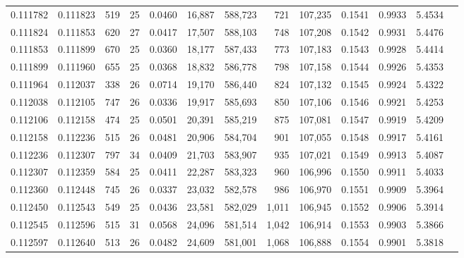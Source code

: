 \begin{tabular}{rrrrrrrrrrrrr}
0.111782 & 0.111823 & 519 &  25 &                                     0.0460 &  16,887 & 588,723 &     721 & 107,235 & 0.1541 & 0.9933 & 5.4534 \\
0.111824 & 0.111853 & 620 &  27 &                                     0.0417 &  17,507 & 588,103 &     748 & 107,208 & 0.1542 & 0.9931 & 5.4476 \\
0.111853 & 0.111899 & 670 &  25 &                                     0.0360 &  18,177 & 587,433 &     773 & 107,183 & 0.1543 & 0.9928 & 5.4414 \\
0.111899 & 0.111960 & 655 &  25 &                                     0.0368 &  18,832 & 586,778 &     798 & 107,158 & 0.1544 & 0.9926 & 5.4353 \\
0.111964 & 0.112037 & 338 &  26 &                                     0.0714 &  19,170 & 586,440 &     824 & 107,132 & 0.1545 & 0.9924 & 5.4322 \\
0.112038 & 0.112105 & 747 &  26 &                                     0.0336 &  19,917 & 585,693 &     850 & 107,106 & 0.1546 & 0.9921 & 5.4253 \\
0.112106 & 0.112158 & 474 &  25 &                                     0.0501 &  20,391 & 585,219 &     875 & 107,081 & 0.1547 & 0.9919 & 5.4209 \\
0.112158 & 0.112236 & 515 &  26 &                                     0.0481 &  20,906 & 584,704 &     901 & 107,055 & 0.1548 & 0.9917 & 5.4161 \\
0.112236 & 0.112307 & 797 &  34 &                                     0.0409 &  21,703 & 583,907 &     935 & 107,021 & 0.1549 & 0.9913 & 5.4087 \\
0.112307 & 0.112359 & 584 &  25 &                                     0.0411 &  22,287 & 583,323 &     960 & 106,996 & 0.1550 & 0.9911 & 5.4033 \\
0.112360 & 0.112448 & 745 &  26 &                                     0.0337 &  23,032 & 582,578 &     986 & 106,970 & 0.1551 & 0.9909 & 5.3964 \\
0.112450 & 0.112543 & 549 &  25 &                                     0.0436 &  23,581 & 582,029 &   1,011 & 106,945 & 0.1552 & 0.9906 & 5.3914 \\
0.112545 & 0.112596 & 515 &  31 &                                     0.0568 &  24,096 & 581,514 &   1,042 & 106,914 & 0.1553 & 0.9903 & 5.3866 \\
0.112597 & 0.112640 & 513 &  26 &                                     0.0482 &  24,609 & 581,001 &   1,068 & 106,888 & 0.1554 & 0.9901 & 5.3818 \\

\end{tabular}
